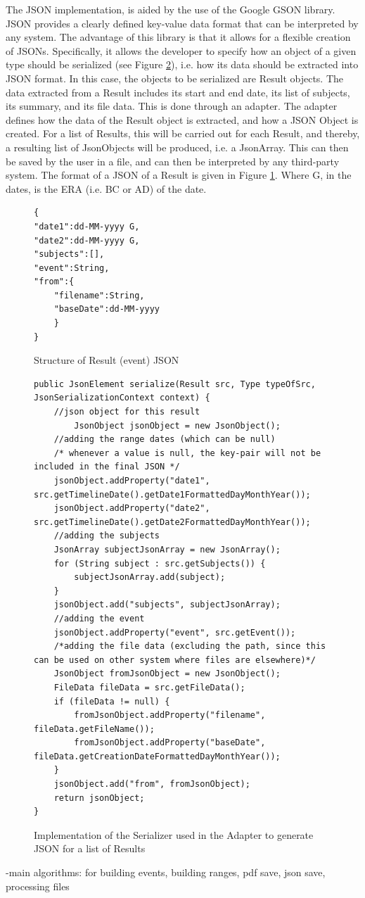 \par The JSON implementation, is aided by the use of the Google GSON library. JSON provides a clearly defined key-value data format that can be interpreted by any system. The advantage of this library is that it allows for a flexible creation of JSONs. Specifically, it allows the developer to specify how an object of a given type should be serialized (see Figure \ref{fig:adapterGsonImplemented}), i.e. how its data should be extracted into JSON format. In this case, the objects to be serialized are Result objects. The data extracted from a Result includes its start and end date, its list of subjects, its summary, and its file data. This is done through an adapter. The adapter defines how the data of the Result object is extracted, and how a JSON Object is created. For a list of Results, this will be carried out for each Result, and thereby, a resulting list of JsonObjects will be produced, i.e. a JsonArray. This can then be saved by the user in a file, and can then be interpreted by any third-party system. The format of a JSON of a Result is given in Figure \ref{fig:jsonResult}. Where G, in the dates, is the ERA (i.e. BC or AD) of the date.

\begin{figure}[h]
\begin{lstlisting}
{
"date1":dd-MM-yyyy G,
"date2":dd-MM-yyyy G,
"subjects":[],
"event":String,
"from":{
	"filename":String,
	"baseDate":dd-MM-yyyy
	}
}
\end{lstlisting}
\caption{Structure of Result (event) JSON}
\label{fig:jsonResult}
\end{figure}
\begin{figure}[H]
\begin{lstlisting}
public JsonElement serialize(Result src, Type typeOfSrc, JsonSerializationContext context) {
	//json object for this result
    	JsonObject jsonObject = new JsonObject();
	//adding the range dates (which can be null)
	/* whenever a value is null, the key-pair will not be included in the final JSON */
	jsonObject.addProperty("date1", src.getTimelineDate().getDate1FormattedDayMonthYear());
	jsonObject.addProperty("date2", src.getTimelineDate().getDate2FormattedDayMonthYear());
	//adding the subjects
	JsonArray subjectJsonArray = new JsonArray();
	for (String subject : src.getSubjects()) {
		subjectJsonArray.add(subject);
	}
	jsonObject.add("subjects", subjectJsonArray);
	//adding the event
	jsonObject.addProperty("event", src.getEvent());
	/*adding the file data (excluding the path, since this can be used on other system where files are elsewhere)*/
	JsonObject fromJsonObject = new JsonObject();
	FileData fileData = src.getFileData();
	if (fileData != null) {
		fromJsonObject.addProperty("filename", fileData.getFileName());
		fromJsonObject.addProperty("baseDate", fileData.getCreationDateFormattedDayMonthYear());
	}
	jsonObject.add("from", fromJsonObject);
	return jsonObject;
}
\end{lstlisting}
\caption{Implementation of the Serializer used in the Adapter to generate JSON for a list of Results}
\label{fig:adapterGsonImplemented}
\end{figure}

-main algorithms: for building events, building ranges, pdf save, json save, processing files
